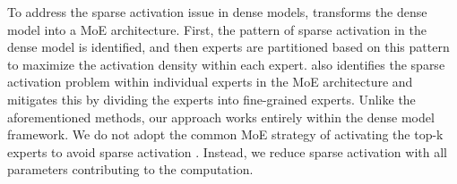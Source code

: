 To address the sparse activation issue in dense models, \citet{zhang2022moefication} transforms the dense model into a MoE architecture. First, the pattern of sparse activation in the dense model is identified, and then experts are partitioned based on this pattern to maximize the activation density within each expert. \citet{yang2024xmoe} also identifies the sparse activation problem within individual experts in the MoE architecture and mitigates this by dividing the experts into fine-grained experts. Unlike the aforementioned methods, our approach works entirely within the dense model framework. We do not adopt the common MoE strategy of activating the top-k experts to avoid sparse activation \cite{fedus2022switch, DBLP:conf/iclr/LepikhinLXCFHKS21}. Instead, we reduce sparse activation with all parameters contributing to the computation.

%